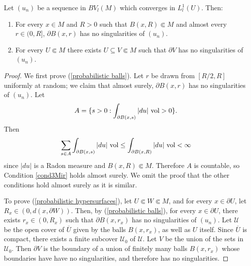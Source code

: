 \begin{lemma}\label{probabilistic method}
Let $(u_n)$ be a sequence in $BV_l(M)$ which converges in $L^1_l(U)$. Then:
\begin{enumerate}
\item \label{probabilistic balls} For every $x \in M$ and $R > 0$ such that $B(x, R) \Subset M$ and almost every $r \in (0, R]$, $\partial B(x, r)$ has no singularities of $(u_n)$.
\item \label{probabilistic hypersurfaces} For every $U \Subset M$ there exists $U \subseteq V \Subset M$ such that $\partial V$ has no singularities of $(u_n)$.
\end{enumerate}
\end{lemma}
\begin{proof}
We first prove (\ref{probabilistic balls}).
Let $r$ be drawn from $[R/2, R]$ uniformly at random; we claim that almost surely, $\partial B(x, r)$ has no singularities of $(u_n)$.
Let
$$A = \{s > 0: \int_{\partial B(x, s)} |du| ~\mathrm{vol} > 0\}.$$
Then
$$\sum_{s \in A} \int_{\partial B(x, s)} |du| ~\mathrm{vol} \leq \int_{\partial B(x, R)} |du| ~\mathrm{vol} < \infty$$
since $|du|$ is a Radon measure and $B(x, R) \Subset M$.
Therefore $A$ is countable,
so Condition \ref{cond3Mir} holds almost surely.
We omit the proof that the other conditions hold almost surely as it is similar.

To prove (\ref{probabilistic hypersurfaces}), let $U \Subset W \Subset M$, and for every $x \in \partial U$, let $R_x \in (0, d(x, \partial W))$.
Then, by (\ref{probabilistic balls}), for every $x \in \partial U$, there exists $r_x \in (0, R_x)$ such that $\partial B(x, r_x)$ has no singularities of $(u_n)$.
Let $\mathcal U$ be the open cover of $\overline U$ given by the balls $B(x, r_x)$, as well as $U$ itself.
Since $\overline U$ is compact, there exists a finite subcover $\mathcal U_0$ of $\mathcal U$.
Let $V$ be the union of the sets in $\mathcal U_0$.
Then $\partial V$ is the boundary of a union of finitely many balls $B(x, r_x)$ whose boundaries have have no singularities, and therefore has no singularities.
\end{proof}

